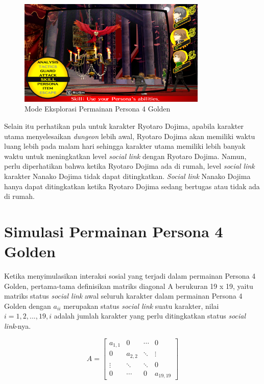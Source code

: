 \begin{figure}[htbp]
    \centering
    \includegraphics[width=0.8\textwidth]{resources/Dokumentasi/Screenshot (377).png}
    \caption{\label{dungeon}Mode Eksplorasi Permainan Persona 4 Golden}
\end{figure}

Selain itu perhatikan pula untuk karakter Ryotaro Dojima, apabila karakter utama menyelesaikan \textit{dungeon} lebih awal, Ryotaro Dojima akan memiliki waktu luang lebih pada malam hari sehingga karakter utama memiliki lebih banyak waktu untuk meningkatkan level \textit{social link} dengan Ryotaro Dojima. Namun, perlu diperhatikan bahwa ketika Ryotaro Dojima ada di rumah, level \textit{social link} karakter Nanako Dojima tidak dapat ditingkatkan. \textit{Social link} Nanako Dojima hanya dapat ditingkatkan ketika Ryotaro Dojima sedang bertugas atau tidak ada di rumah.


\section{Simulasi Permainan Persona 4 Golden}
Ketika menyimulasikan interaksi sosial yang terjadi dalam permainan Persona 4 Golden, pertama-tama definisikan matriks diagonal A berukuran 19 x 19, yaitu matriks status \textit{social link} awal seluruh karakter dalam permainan Persona 4 Golden dengan $a_{ii}$ merupakan status \textit{social link} suatu karakter, nilai $i = 1,2,...,19, i$ adalah jumlah karakter yang perlu ditingkatkan status \textit{social link}-nya.

\[
    A =
    \begin{bmatrix}
        a_{1,1} & 0       & \cdots & 0         \\
        0       & a_{2,2} & \ddots & \vdots    \\
        \vdots  & \ddots  & \ddots & 0         \\
        0       & \cdots  & 0      & a_{19,19}
    \end{bmatrix}
\]


